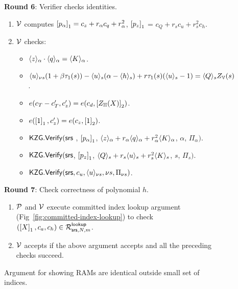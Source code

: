 \begin{figure}[htbp]
\begin{mdframed}
        {\bf Round 6}: Verifier checks identities.
        \begin{enumerate}[leftmargin=1em, label=\arabic*.]
        \item $\verifier$ computes $\gone{p_\alpha}=c_z + r_\alpha c_q + r_\alpha^2$, $\gone{p_z}$ = $c_Q + r_s c_u + r_s^2 c_h$.
        \item $\verifier$ checks:
            \begin{itemize}[leftmargin=1em, label=-]
                \item $\val{\alpha}{z}\cdot \val{\alpha}{q}=\val{\alpha}{K}$.
                \item $\val{\nu s}{u}(1+\beta \tau_1(s)) - \val{s}{u}(\alpha - \val{s}{h}) + r\tau_1(s)(\val{s}{u}-1)=\val{s}{Q}Z_\setV(s)$.
                \item $e(c_T - c_T', c_z')=e(c_d, \gtwo{\vpolyN(X)})$.
                \item $e(\gone{1},c_z')=e(c_z, \gtwo{1})$.
                \item $\kzgverify(\srs$ ,
        $\gone{p_\alpha}$, $\val{\alpha}{z}+r_\alpha \val{\alpha}{q} + r_\alpha^2 \val{\alpha}{K}$, $\alpha$, $\Pi_\alpha)$.
                \item $\kzgverify(\srs$,
                $\gone{p_z}$,  $\val{s}{Q}+r_s \val{s}{u} + r_s^2 \val{s}{K}$, $s$, $\Pi_s)$.
                \item $\kzgverify(\srs,c_u, \val{\nu s}{u}, \nu s, \Pi_{\nu s})$.
            \end{itemize}
        \end{enumerate}

        {\bf Round 7}: Check correctness of polynomial $h$.
        \begin{enumerate}[leftmargin=1em, label=\arabic*.]
        \item $\prover$ and $\verifier$ execute committed index lookup argument (Fig~\ref{fig:committed-index-lookup})
        to check $(\gone{X},c_a,c_h)\in \RLOOK$.
        \item $\verifier$ accepts if the above argument accepts and all the preceding checks succeed.
        \end{enumerate}
    \end{mdframed}
    \caption{Argument for showing RAMs are identical outside small set of indices.}
    \label{fig:a-identical}
\end{figure}

